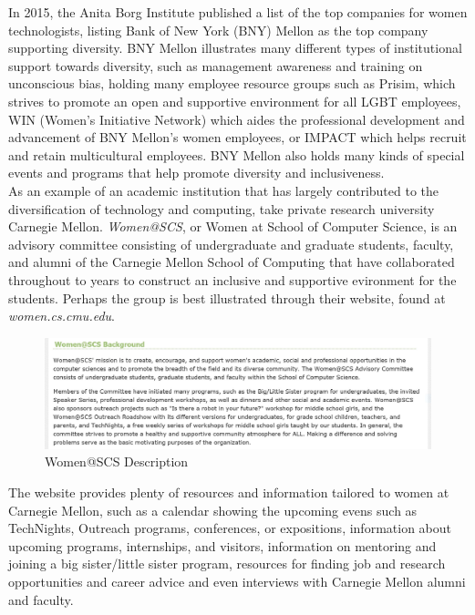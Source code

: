 \documentclass[12pt]{article}
\begin{document}
	In 2015, the Anita Borg Institute published a list of the top companies for women technologists, listing Bank of New York (BNY) Mellon as the top company supporting diversity. BNY Mellon illustrates many different types of institutional support towards diversity, such as management awareness and training on unconscious bias, holding many employee resource groups such as Prisim, which strives to promote an open and supportive environment for all LGBT employees, WIN (Women's Initiative Network) which aides the professional development and advancement of BNY Mellon's women employees, or IMPACT which helps recruit and retain multicultural employees.  BNY Mellon also holds many kinds of special events and programs that help promote diversity and inclusiveness.\\ 
	
	As an example of an academic institution that has largely contributed to the diversification of technology and computing, take private research university Carnegie Mellon. \textit{Women@SCS}, or Women at School of Computer Science, is an advisory committee consisting of undergraduate and graduate students, faculty, and alumni of the Carnegie Mellon School of Computing that have collaborated throughout to years to construct an inclusive and supportive evironment for the students. Perhaps the group is best illustrated through their website, found at \textit{women.cs.cmu.edu}.\\
	
			\begin{figure}[H]
				\begin{center}
					\includegraphics[width=\textwidth,keepaspectratio]{CarnegieMellon}
					\caption{Women@SCS Description}
				\end{center}
			\end{figure}
			
	The website provides plenty of resources and information tailored to women at Carnegie Mellon, such as a calendar showing the upcoming evens such as TechNights, Outreach programs, conferences, or expositions, information about upcoming programs, internships, and visitors, information on mentoring and joining a big sister/little sister program, resources for finding job and research opportunities and career advice and even interviews with Carnegie Mellon alumni and faculty.
	
\end{document}
